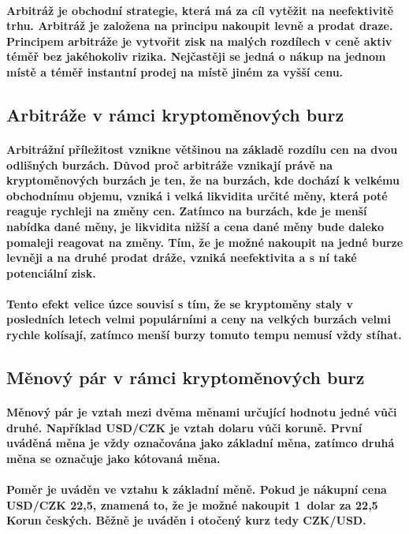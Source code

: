 \documentclass[thesis=B,czech]{FITthesis}[2019/03/21]
\begin{document}
\paragraph{
Arbitráž je obchodní strategie, která má za cíl vytěžit na neefektivitě trhu. Arbitráž je založena na principu nakoupit levně a prodat draze. Principem arbitráže je vytvořit zisk na malých rozdílech v ceně aktiv téměř bez jakéhokoliv rizika. Nejčastěji se jedná o nákup na jednom místě a téměř instantní prodej na místě jiném za vyšší cenu. \cite{Capital}
}
\subsection{Arbitráže v rámci kryptoměnových burz}
\paragraph{
Arbitrážní příležitost vznikne většinou na základě rozdílu cen na dvou odlišných burzách. Důvod proč arbitráže vznikají právě na kryptoměnových burzách je ten, že na burzách, kde dochází k velkému obchodnímu objemu, vzniká i velká likvidita určité měny, která poté reaguje rychleji na změny cen. Zatímco na burzách, kde je menší nabídka dané měny, je likvidita nižší a cena dané měny bude daleko pomaleji reagovat na změny. Tím, že je možné nakoupit na jedné burze levněji a na druhé prodat dráže, vzniká neefektivita a s ní také potenciální zisk.
}
\paragraph{
Tento efekt velice úzce souvisí s tím, že se kryptoměny staly v posledních letech velmi populárními a ceny na velkých burzách velmi rychle kolísají, zatímco menší burzy tomuto tempu nemusí vždy stíhat. \cite{finder}
}

\subsection{Měnový pár v rámci kryptoměnových burz}
\paragraph{
Měnový pár je vztah mezi dvěma měnami určující hodnotu jedné vůči druhé. Například USD/CZK je vztah dolaru vůči koruně. První uváděná měna je vždy označována jako základní měna, zatímco druhá měna se označuje jako kótovaná měna. \cite{Capital_menovy_par} 
} 
\paragraph{
Poměr je uváděn ve vztahu k základní měně. Pokud je nákupní cena USD/CZK 22,5, znamená to, že je možné nakoupit 1~dolar za 22,5~ Korun českých. Běžně je uváděn i otočený kurz tedy CZK/USD. \cite{Capital_menovy_par} 
}
\end{document}
